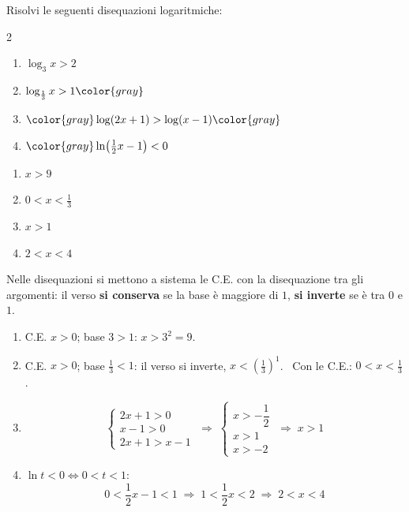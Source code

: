 \begin{question}[ID=3.1, subtitle={Disequazioni logaritmiche elementari}, difficulty=facile, tags={disequazioni logaritmiche, definizione}]
Risolvi le seguenti disequazioni logaritmiche:
\begin{center}\begin{minipage}{0.92\linewidth}
\begin{multicols}{2}
\begin{enumerate}[leftmargin=3.2cm]
\item $\log_3 x > 2$
\item $\log_{\frac{1}{3}} x > 1 \color{gray}$
\item $\color{gray}\log(2x+1) > \log(x-1) \color{gray}$
\item $\color{gray}\ln\!\left( \tfrac{1}{2} x -1 \right) < 0$
\end{enumerate}
\end{multicols}
\end{minipage}\end{center}
\begin{solution}
\begin{enumerate}
    \item $x>9$
    \item $0<x<\tfrac13$
    \item $x>1$
    \item $2<x<4$
\end{enumerate}
\end{solution}
\begin{explanation}
Nelle disequazioni si mettono a sistema le C.E. con la disequazione tra gli argomenti: il verso \textbf{si conserva} se la base è maggiore di $1$, \textbf{si inverte} se è tra $0$ e $1$.
\begin{enumerate}
    \item C.E. $x>0$; base $3>1$: $x>3^2=9$.
    \item C.E. $x>0$; base $\tfrac13<1$: il verso si inverte, $x<\left(\tfrac13\right)^1$. \ Con le C.E.: $0<x<\tfrac13$.
    \item \[ \begin{cases} 2x+1>0\\ x-1>0\\ 2x+1>x-1 \end{cases} \;\Rightarrow\; \begin{cases} x>-\dfrac12\\ x>1\\ x>-2 \end{cases} \;\Rightarrow\; x>1 \]
    \item $\ln t<0 \iff 0<t<1$:
    \[ 0<\dfrac12x-1<1 \;\Rightarrow\; 1<\dfrac12x<2 \;\Rightarrow\; 2<x<4 \]
\end{enumerate}
\end{explanation}
\end{question}

